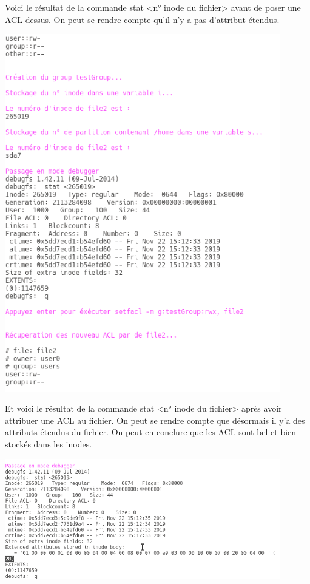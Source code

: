 \documentclass{article}
\begin{document}
\newpage
Voici le résultat de la commande stat <n° inode du fichier> avant de poser une ACL dessus. On peut se rendre compte qu'il n'y a pas d'attribut étendus.
\begin{center}
    \includegraphics[width=12cm]{images/sortie1Debug.png}
\end{center}
\newpage
Et voici le résultat de la commande stat <n° inode du fichier> après avoir attribuer une ACL au fichier. On peut se rendre compte que désormais il y'a des attributs étendus du fichier. On peut en conclure que les ACL sont bel et bien stockés dans les inodes.  
\begin{center}
\includegraphics[width=12cm]{images/sortie2Debug.png}
\end{center}
\end{document}
